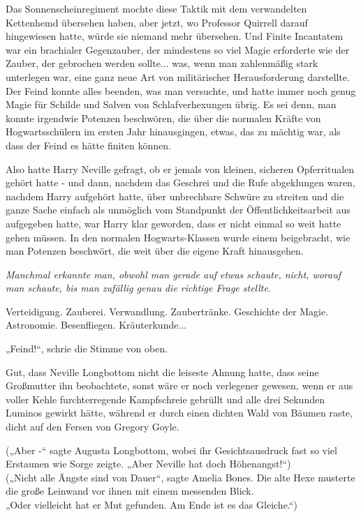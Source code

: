 {Das Sonnenscheinregiment mochte diese Taktik mit dem verwandelten Kettenhemd übersehen haben, aber jetzt, wo Professor Quirrell darauf hingewiesen hatte, würde sie niemand mehr übersehen. Und Finite Incantatem war ein brachialer Gegenzauber, der mindestens so viel Magie erforderte wie der Zauber, der gebrochen werden sollte... was, wenn man zahlenmäßig stark unterlegen war, eine ganz neue Art von militärischer Herausforderung darstellte. Der Feind konnte alles beenden, was man versuchte, und hatte immer noch genug Magie für Schilde und Salven von Schlafverhexungen übrig. Es sei denn, man konnte irgendwie Potenzen beschwören, die über die normalen Kräfte von Hogwartsschülern im ersten Jahr hinausgingen, etwas, das zu mächtig war, als dass der Feind es hätte finiten können.

Also hatte Harry Neville gefragt, ob er jemals von kleinen, sicheren Opferritualen gehört hatte - und dann, nachdem das Geschrei und die Rufe abgeklungen waren, nachdem Harry aufgehört hatte, über unbrechbare Schwüre zu streiten und die ganze Sache einfach als unmöglich vom Standpunkt der Öffentlichkeitsarbeit aus aufgegeben hatte, war Harry klar geworden, dass er nicht einmal so weit hatte gehen müssen. In den normalen Hogwarts-Klassen wurde einem beigebracht, wie man Potenzen beschwört, die weit über die eigene Kraft hinausgehen.

\emph{Manchmal erkannte man, obwohl man gerade auf etwas schaute, nicht, worauf man schaute, bis man zufällig genau die richtige Frage stellte}.

Verteidigung. Zauberei. Verwandlung. Zaubertränke. Geschichte der Magie. Astronomie. Besenfliegen. Kräuterkunde...

„Feind!“, schrie die Stimme von oben.

Gut, dass Neville Longbottom nicht die leiseste Ahnung hatte, dass seine Großmutter ihn beobachtete, sonst wäre er noch verlegener gewesen, wenn er aus voller Kehle furchterregende Kampfschreie gebrüllt und alle drei Sekunden Luminos gewirkt hätte, während er durch einen dichten Wald von Bäumen raste, dicht auf den Fersen von Gregory Goyle.

(„Aber -“ sagte Augusta Longbottom, wobei ihr Gesichtsausdruck fast so viel Erstaunen wie Sorge zeigte. „Aber Neville hat doch Höhenangst!“)\\ („Nicht alle Ängste sind von Dauer“, sagte Amelia Bones. Die alte Hexe musterte die große Leinwand vor ihnen mit einem messenden Blick.\\ „Oder vielleicht hat er Mut gefunden. Am Ende ist es das Gleiche.“)

}
